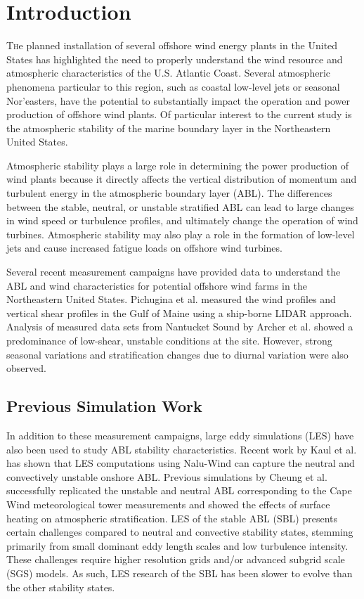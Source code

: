 \documentclass[conf]{new-aiaa}
\begin{document}
\section{Introduction}

\lettrine{T}he planned installation of several offshore wind energy
plants in the United States has highlighted the need to properly
understand the wind resource and atmospheric characteristics of the U.S.
Atlantic Coast.  Several atmospheric phenomena particular to this
region, such as coastal low-level jets or seasonal Nor’easters, have
the potential to substantially impact the operation and power
production of offshore wind plants.  Of particular interest to the
current study is the atmospheric stability of the marine boundary
layer in the Northeastern United States.

Atmospheric stability plays a large role in determining the power
production of wind plants because it directly affects the vertical
distribution of momentum and turbulent energy in the atmospheric
boundary layer (ABL).  The differences between the stable, neutral, or
unstable stratified ABL can lead to large changes in wind speed or
turbulence profiles, and ultimately change the operation of wind
turbines.  Atmospheric stability may also play a role in the formation
of low-level jets \cite{nunalee2014mesoscale} and cause increased
fatigue loads on offshore wind turbines.

Several recent measurement campaigns have provided data to understand
the ABL and wind characteristics for potential offshore wind farms in
the Northeastern United States.  Pichugina et al. \cite{pichugina2017properties}
measured the wind profiles and vertical shear profiles in the Gulf of
Maine using a ship-borne LIDAR approach.  Analysis of measured data
sets from Nantucket Sound by Archer et
al. \cite{archer2016predominance} showed a predominance of low-shear,
unstable conditions at the site.  However, strong seasonal variations
and stratification changes due to diurnal variation were also
observed.

\subsection{Previous Simulation Work}

In addition to these measurement campaigns, large eddy simulations (LES) have
also been used to study ABL stability characteristics.  Recent work by
Kaul et al. \cite{kaul2020large} has shown that LES computations using
Nalu-Wind can capture the neutral and convectively unstable onshore
ABL.  Previous simulations by Cheung et al. \cite{cheung2020large}
successfully replicated the unstable and neutral ABL corresponding to
the Cape Wind meteorological tower measurements
\cite{archer2016predominance} and showed the effects of surface
heating on atmospheric stratification. LES of the stable ABL (SBL) presents
certain challenges compared to neutral and convective stability states, stemming
primarily from small dominant eddy length scales and low turbulence intensity.
These challenges require higher resolution grids and/or advanced subgrid
scale (SGS) models. As such, LES research of the SBL has been slower
to evolve than the other stability states.
\end{document}
